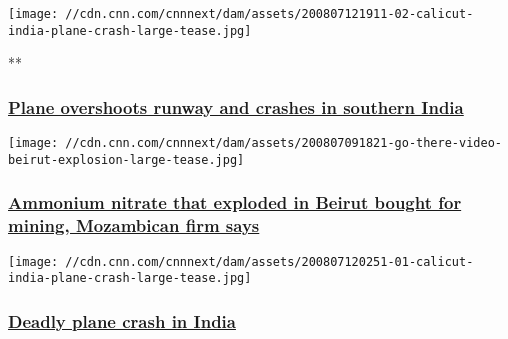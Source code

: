 \href{/videos/world/2020/08/07/plane-crash-kozhikode-international-airport-air-india-express-vedika-sud-intl-vpx.cnn}{}

\texttt{[image: //cdn.cnn.com/cnnnext/dam/assets/200807121911-02-calicut-india-plane-crash-large-tease.jpg]}

**

\hypertarget{plane-overshoots-runway-and-crashes-in-southern-india}{%
\subsubsection{\texorpdfstring{\href{/videos/world/2020/08/07/plane-crash-kozhikode-international-airport-air-india-express-vedika-sud-intl-vpx.cnn}{Plane
overshoots runway and crashes in southern
India}}{Plane overshoots runway and crashes in southern India}}\label{plane-overshoots-runway-and-crashes-in-southern-india}}

\href{/2020/08/07/middleeast/beirut-lebanon-ammonium-nitrate-explosion/index.html}{}

\texttt{[image: //cdn.cnn.com/cnnnext/dam/assets/200807091821-go-there-video-beirut-explosion-large-tease.jpg]}

\hypertarget{ammonium-nitrate-that-exploded-in-beirut-bought-for-mining-mozambican-firm-says--1}{%
\subsubsection{\texorpdfstring{\href{/2020/08/07/middleeast/beirut-lebanon-ammonium-nitrate-explosion/index.html}{Ammonium
nitrate that exploded in Beirut bought for mining, Mozambican firm says
}}{Ammonium nitrate that exploded in Beirut bought for mining, Mozambican firm says }}\label{ammonium-nitrate-that-exploded-in-beirut-bought-for-mining-mozambican-firm-says--1}}

\href{/world/live-news/india-plane-crash-august-2020/index.html}{}

\texttt{[image: //cdn.cnn.com/cnnnext/dam/assets/200807120251-01-calicut-india-plane-crash-large-tease.jpg]}

\hypertarget{deadly-plane-crash-in-india}{%
\subsubsection{\texorpdfstring{\href{/world/live-news/india-plane-crash-august-2020/index.html}{Deadly
plane crash in
India}}{Deadly plane crash in India}}\label{deadly-plane-crash-in-india}}

\href{/videos/world/2020/08/07/evacuation-glacier-collapse-mont-blanc-italy-lon-orig-na.cnn}{}

